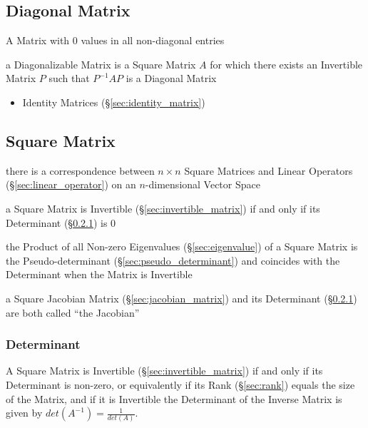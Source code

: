 \subsection{Diagonal Matrix}\label{sec:diagonal_matrix}

A Matrix with $0$ values in all non-diagonal entries

a Diagonalizable Matrix is a Square Matrix $A$ for which there exists an
Invertible Matrix $P$ such that $P^{-1}AP$ is a Diagonal Matrix

\begin{itemize}
  \item Identity Matrices (\S\ref{sec:identity_matrix})
\end{itemize}



\subsection{Square Matrix}\label{sec:square_matrix}

there is a correspondence between $n\times{n}$ Square Matrices and Linear
Operators (\S\ref{sec:linear_operator}) on an $n$-dimensional Vector Space

a Square Matrix is Invertible (\S\ref{sec:invertible_matrix}) if and only if
its Determinant (\S\ref{sec:determinant}) is $0$

the Product of all Non-zero Eigenvalues (\S\ref{sec:eigenvalue}) of a Square
Matrix is the Pseudo-determinant (\S\ref{sec:pseudo_determinant}) and coincides
with the Determinant when the Matrix is Invertible

a Square Jacobian Matrix (\S\ref{sec:jacobian_matrix}) and its Determinant
(\S\ref{sec:determinant}) are both called ``the Jacobian''



\subsubsection{Determinant}\label{sec:determinant}

A Square Matrix is Invertible (\S\ref{sec:invertible_matrix}) if and only if
its Determinant is non-zero, or equivalently if its Rank (\S\ref{sec:rank})
equals the size of the Matrix, and if it is Invertible the Determinant of the
Inverse Matrix is given by $det(A^{-1}) = \frac{1}{det(A)}$.

